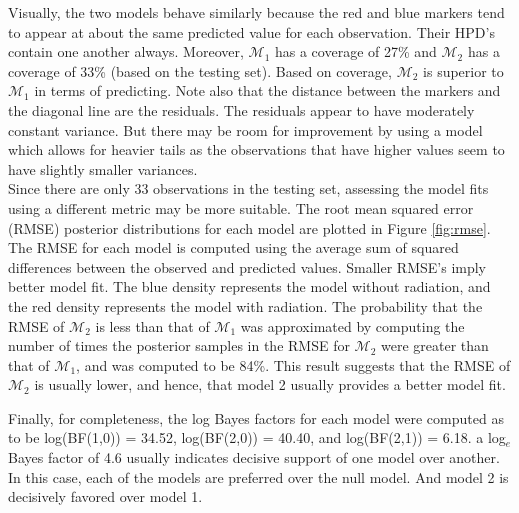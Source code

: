 \documentclass{../../tex_template/asaproc}
\newcommand{\M}{\mathcal{M}}
\begin{document}
Visually, the two models behave similarly because the red and blue markers tend
to appear at about the same predicted value for each observation. Their HPD's
contain one another always. Moreover, $\M_1$ has a coverage of 27\% and $\M_2$ has
a coverage of 33\% (based on the testing set). Based on coverage, $\M_2$ is superior
to $\M_1$ in terms of predicting. Note also that the distance between
the markers and the diagonal line are the residuals. The residuals appear
to have moderately constant variance. But there may be room for improvement
by using a model which allows for heavier tails as the observations that
have higher values seem to have slightly smaller variances.\\

Since there are only 33 observations in the testing set, assessing the model
fits using a different metric may be more suitable. The root mean squared error
(RMSE) posterior distributions for each model are plotted in Figure
\ref{fig:rmse}. The RMSE for each model is computed using the average sum of
squared differences between the observed and predicted values. Smaller RMSE's
imply better model fit. The blue density represents the model without
radiation, and the red density represents the model with radiation.  The
probability that the RMSE of $\M_2$ is less than that of $\M_1$ was
approximated by computing the number of times the posterior samples in the RMSE
for $\M_2$ were greater than that of $\M_1$, and was computed to be 84\%.
This result suggests that the RMSE of $\M_2$ is usually lower, and hence, that
model 2 usually provides a better model fit.

Finally, for completeness, the log Bayes factors for each model were computed
as to be log(BF(1,0)) = 34.52, log(BF(2,0)) =  40.40, and log(BF(2,1)) = 6.18.
a log$_e$ Bayes factor of 4.6 usually indicates decisive support of one model
over another. In this case, each of the models are preferred over the null
model. And model 2 is decisively favored over model 1. \\
\end{document}
